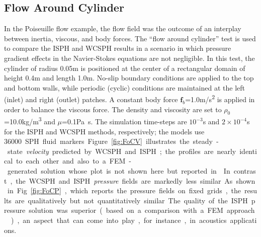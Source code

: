 \subsection{Flow Around Cylinder}
\label{subsec:flowAroundCylinder}
In the Poiseuille flow example, the flow field was the outcome of an interplay between inertia, viscous, and body forces. The ``flow around cylinder'' test is used to compare the ISPH and WCSPH results in a scenario in which pressure gradient effects in the Navier-Stokes equations are not negligible. In this test, the cylinder of radius 0.05\si{m} is positioned at the center of a rectangular domain of height 0.4\si{m} and length 1.0\si{m}. No-slip boundary conditions are applied to the top and bottom walls, while periodic (cyclic) conditions are maintained at the left (inlet) and right (outlet) patches. A constant body force $\mathbf{f}_b$=1.0\si{m/s^2} is applied in order to balance the viscous force. The density and viscosity are set to $\rho_0$=10.0\si{kg/m^3} and $\mu$=0.1\si{Pa.s}. The simulation time-steps are $10^{-3}$\si{s} and $2\times 10^{-4}$\si{s} for the ISPH and WCSPH methods, respectively; the models use \SI{36000} SPH fluid markers. Figure~\ref{fig:FoCV} illustrates the steady-state {\textit{velocity}} predicted by WCSPH and ISPH; the profiles are nearly identical to each other and also to a FEM-generated solution whose plot is not shown here but reported in \cite{lagrangianVSeulerian2019}. In contrast, the WCSPH and ISPH {\textit{pressure}} fields are markedly less similar. As shown in Fig.~\ref{fig:FoCP}, which reports the pressure fields on fixed grids, the results are qualitatively but not quantitatively similar. The quality of the ISPH pressure solution was superior (based on a comparison with a FEM approach \cite{lagrangianVSeulerian2019}), an aspect that can come into play, for instance, in acoustics applications.
